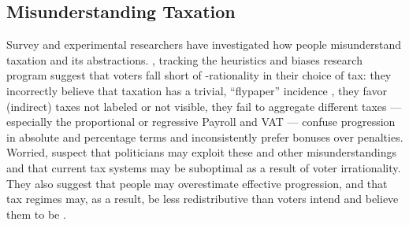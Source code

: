 
\subsection{Misunderstanding Taxation}
Survey and experimental researchers have investigated how people misunderstand taxation and its abstractions.
\cite{McCafferyBaron2003}, tracking the heuristics and biases research program \citep{KahnemanEtAl1982} suggest that voters fall short of \citeauthor{VonNeumannMorgenstern1944}-rationality in their choice of tax: they incorrectly believe that taxation has a trivial, ``flypaper'' incidence \citep{McCafferyBaron2004b}, they favor (indirect) taxes not labeled or not visible, they fail to aggregate different taxes --- especially the proportional or regressive \gls{Payroll} and \gls{VAT} --- confuse progression in absolute and percentage terms and inconsistently prefer bonuses over penalties. 
Worried, \cite{McCafferyBaron2004} suspect that politicians may exploit these and other misunderstandings and that current tax systems may be suboptimal as a result of voter irrationality.
They also suggest that people may overestimate effective progression, and that tax regimes may, as a result, be less redistributive than voters intend and believe them to be \citep{McCafferyBaron2004}.

